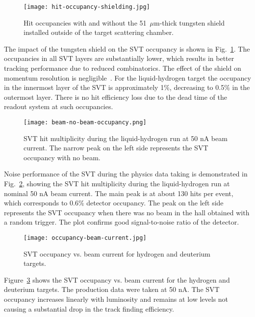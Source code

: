 \begin{figure}[hbt] 
\centering 
\texttt{[image: hit-occupancy-shielding.jpg]}
\caption{Hit occupancies with and without the 51~$\mu$m-thick tungsten shield installed outside of the target scattering chamber.}
\label{fig:hit-occupancy-shielding}
\end{figure}

The impact of the tungsten shield on the SVT occupancy is shown in Fig.~\ref{fig:hit-occupancy-shielding}. The occupancies in all SVT layers are substantially lower, which results in better tracking performance due to reduced combinatorics. The effect of the shield on momentum resolution is negligible~\cite{SHIELDNOTE}. For the liquid-hydrogen target the occupancy in the innermost layer of the SVT is approximately 1$\%$, decreasing to 0.5$\%$ in the outermost layer. There is no hit efficiency loss due to the dead time of the readout system at such occupancies.

\begin{figure}[hbt] 
\centering 
\texttt{[image: beam-no-beam-occupancy.png]}
\caption{SVT hit multiplicity during the liquid-hydrogen run at 50 nA beam current. The narrow peak on the left side represents the SVT occupancy with no beam.}
\label{fig:beam-no-beam-occupancy}
\end{figure}

Noise performance of the SVT during the physics data taking is demonstrated in Fig.~\ref{fig:beam-no-beam-occupancy}, showing the SVT hit multiplicity during the liquid-hydrogen run at nominal 50 nA beam current. The main peak is at about 130 hits per event, which corresponds to 0.6$\%$ detector occupancy. The peak on the left side represents the SVT occupancy when there was no beam in the hall obtained with a random trigger. The plot confirms good signal-to-noise ratio of the detector. 

\begin{figure}[hbt] 
\centering 
\texttt{[image: occupancy-beam-current.jpg]}
\caption{SVT occupancy vs. beam current for hydrogen and deuterium targets.}
\label{fig:occupancy-beam-current}
\end{figure}

Figure~\ref{fig:occupancy-beam-current} shows the SVT occupancy vs. beam current for the hydrogen and deuterium targets. The production data were taken at 50 nA. The SVT occupancy increases linearly with luminosity and remains at low levels not causing a substantial drop in the track finding efficiency.

